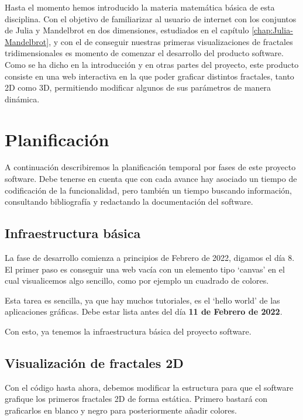 %
%

Hasta el momento hemos introducido la materia matemática básica de esta disciplina. Con el objetivo de familiarizar al usuario de internet con los conjuntos de Julia y Mandelbrot en dos dimensiones, estudiados en el capítulo \ref{chap:Julia-Mandelbrot}, y con el de conseguir nuestras primeras visualizaciones de fractales tridimensionales es momento de comenzar el desarrollo del producto software. Como se ha dicho en la introducción y en otras partes del proyecto, este producto consiste en una web interactiva en la que poder graficar distintos fractales, tanto 2D como 3D, permitiendo modificar algunos de sus parámetros de manera dinámica.  

\section*{Planificación}

A continuación describiremos la planificación temporal por fases de este proyecto software. Debe tenerse en cuenta que con cada avance hay asociado un tiempo de codificación de la funcionalidad, pero también un tiempo buscando información, consultando bibliografía y redactando la documentación del software.

\subsection*{Infraestructura básica}

La fase de desarrollo comienza a principios de Febrero de 2022, digamos el día 8. El primer paso es conseguir una web vacía con un elemento tipo `canvas' en el cual visualicemos algo sencillo, como por ejemplo un cuadrado de colores.

Esta tarea es sencilla, ya que hay muchos tutoriales, es el `hello world' de las aplicaciones gráficas. Debe estar lista antes del día \textbf{11 de Febrero de 2022}.

Con esto, ya tenemos la infraestructura básica del proyecto software.

\subsection*{Visualización de fractales 2D}

Con el código hasta ahora, debemos modificar la estructura para que el software grafique los primeros fractales 2D de forma estática. Primero bastará con graficarlos en blanco y negro para posteriormente añadir colores.

